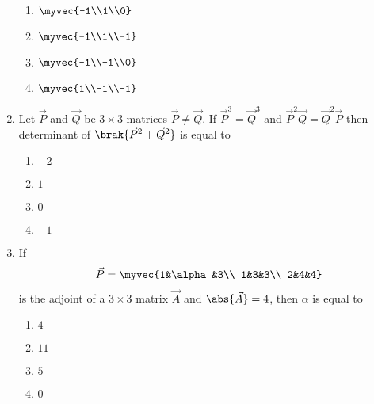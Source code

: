 \begin{enumerate}[label=\thesubsection.\arabic*.,ref=\thesubsection.\theenumi]
	\hfill{}
\begin{multicols}{4}
        \begin{enumerate}
	    	\item $ \myvec{-1\\1\\0} $ 
		\item $ \myvec{-1\\1\\-1} $ 
		\item $ \myvec{-1\\-1\\0} $
		\item $ \myvec{1\\-1\\-1} $ 
        \end{enumerate}
\end{multicols}
%
	\item Let $\vec{P}$ and $\vec{Q}$ be $3\times3$ matrices $\vec{P}\neq \vec{Q}$. If $\vec{P}^3=\vec{Q}^3$ and $\vec{P}^2\vec{Q}=\vec{Q}^2\vec{P}$ then determinant of $\brak{\vec{P}^2+\vec{Q}^2}$ is equal to
	\hfill{}
\begin{multicols}{4}
        \begin{enumerate}
                \item $-2$
                \item $1$
                \item $0$
                \item $-1$
        \end{enumerate}
\end{multicols}
%
	\item If \begin{align*}
		\vec{P} = \myvec{1&\alpha&3\\
		1&3&3\\
		2&4&4}
	\end{align*} is the adjoint of a $3\times3$ matrix $\vec{A}$ and $\abs{\vec{A}} = 4$, then $\alpha$ is equal to
	\hfill{}
\begin{multicols}{4}
        \begin{enumerate}
                \item $4$
                \item $11$
                \item $5$
                \item $0$
        \end{enumerate}
\end{multicols}

\end{enumerate}
